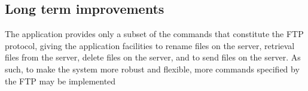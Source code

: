 \subsection{Long term improvements}
The application provides only a subset of the commands that constitute the FTP protocol, giving the application facilities to rename files on the server, retrieval files from the server, delete files on the server, and to send files on the server. As such, to make the system more robust and flexible, more commands specified by the FTP may be implemented 

